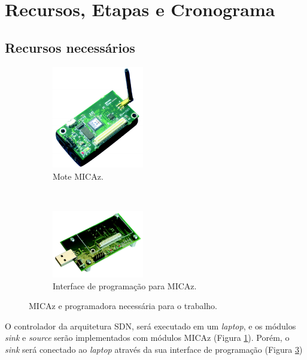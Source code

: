 \section{Recursos, Etapas e Cronograma}

\subsection{Recursos necessários}

\begin{figure}[t!]
    \centering
    \begin{subfigure}[t]{0.45\textwidth}
        \centering
        \includegraphics[width=4cm]{figs/ModulosMICAZ.png}
        \caption{Mote MICAz. \cite{micaz2013wireless}}
        \label{ModulosMICAZ}
    \end{subfigure}%
    ~ 
    \begin{subfigure}[t]{0.45\textwidth}
        \centering
        \includegraphics[width=4cm]{figs/InterfaceMICAZ.png}
        \caption{Interface de programação para MICAz. \cite{micaz2013wireless}}
        \label{InterfaceMICAZ}
    \end{subfigure}
    \caption{MICAz e programadora necessária para o trabalho.}
\end{figure}

O controlador da arquitetura \ac{SDN}, será executado em um \textit{laptop}, e os módulos \textit{sink} e \textit{source} serão implementados com módulos MICAz (Figura \ref{ModulosMICAZ}). Porém, o \textit{sink} será conectado ao \textit{laptop} através da sua interface de programação (Figura \ref{InterfaceMICAZ})


